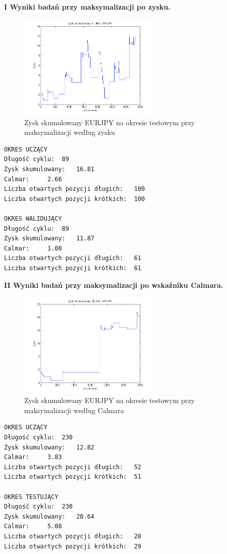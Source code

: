 \noindent \textbf{I Wyniki badań przy maksymalizacji po zysku.}\\
\begin{figure}[h!]
\centering
\includegraphics[width = 0.6\textwidth]{ROC_EURJPY_LS_SearchBestK_zysk.png}
\caption{Zysk skumulowany EURJPY na okresie testowym przy maksymalizacji według zysku}
\end{figure}
\FloatBarrier
\begin{verbatim}
OKRES UCZĄCY
Długość cyklu: 	89
Zysk skumulowany: 	16.81
Calmar: 	2.66
Liczba otwartych pozycji długich: 	100
Liczba otwartych pozycji krótkich: 	100

OKRES WALIDUJĄCY
Długość cyklu: 	89
Zysk skumulowany: 	11.87
Calmar: 	1.00
Liczba otwartych pozycji długich: 	61
Liczba otwartych pozycji krótkich: 	61
\end{verbatim}
\newpage
\textbf{II Wyniki badań przy maksymalizacji po wskaźniku Calmara.}\\
\begin{figure}[h!]
\centering
\includegraphics[width = 0.6\textwidth]{ROC_EURJPY_LS_SearchBestKCalmar_zysk.png}
\caption{Zysk skumulowany EURJPY na okresie testowym przy maksymalizacji według Calmara}
\end{figure}
\FloatBarrier
\begin{verbatim}
OKRES UCZĄCY
Długość cyklu: 	230
Zysk skumulowany: 	12.82
Calmar: 	3.83
Liczba otwartych pozycji długich: 	52
Liczba otwartych pozycji krótkich: 	51

OKRES TESTUJĄCY
Długość cyklu: 	230
Zysk skumulowany: 	20.64
Calmar: 	5.08
Liczba otwartych pozycji długich: 	28
Liczba otwartych pozycji krótkich: 	29
\end{verbatim}
%
